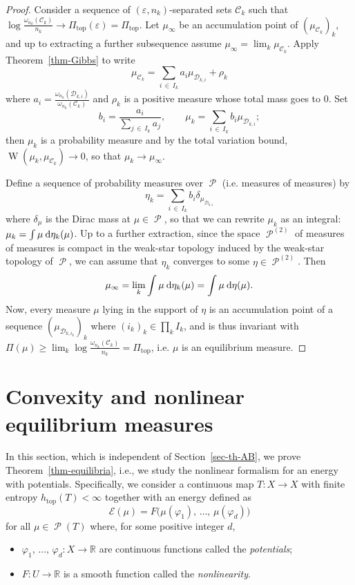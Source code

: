 \documentclass[AHL, Unicode, longabstracts,published]{cedram}
\theoremstyle{plain}
\theoremstyle{plain}
\newcommand\NLP{\Pi}
\renewcommand\top{{\mathrm{top}}}
\newcommand{\wass}{\operatorname{W}}
\newcommand\Prob{{\operatorname{\mathscr{P}}}}
\newcommand*{\dd} {\relax\ifnum\lastnodetype>0\mskip\medmuskip\fi\mathrm{d}}
\newcommand{\pot}{\varphi}
\newcounter{In}
\newcommand*\8{\infty}
\newcommand\RR{\mathbb{R}}
\newcommand{\En}{\mathcal{E}}
\newcommand{\cD}{\mathcal{D}}
\newcommand{\cC}{\mathcal C}
\begin{document}
\begin{proof}
Consider a sequence of $(\varepsilon,n_k)$-separated sets $\cC_k$ such that $\log\frac{\omega_{n_k}(\cC_k)}{n_k} \to \NLP_\top(\varepsilon) = \NLP_\top$. Let $\mu_\infty$ be an accumulation point of $(\mu_{\cC_k})_k$, and up to extracting a further subsequence assume $\mu_\infty = \lim_k \mu_{\cC_k}$. Apply Theorem~\ref{thm-Gibbs} to write
\[
\mu_{\cC_k} = \sum_{i\,\in\,I_k} a_i \mu_{\cD_{k,i}} + \rho_k
\]
where $a_i = \frac{\omega_{n_k}(\cD_{k,i})}{\omega_{n_k}(\cC_k)}$ and $\rho_k$ is a positive measure whose total mass goes to $0$. Set
\[
b_i=\frac{a_i}{\sum_{j\,\in\,I_k} a_j}, \qquad \mu_k= \sum_{i\,\in\,I_k} b_i \mu_{\cD_{k,i}};
\]
then $\mu_k$ is a probability measure and by the total variation bound, $\wass(\mu_k,\mu_{\cC_k})\to0$, so that $\mu_k\to\mu_\infty$.

Define a sequence of probability measures over $\Prob$ (i.e. measures of measures) by
\[
\eta_k=\sum_{i\,\in\,I_k} b_i \delta_{\mu_{\cD_{k,i}}}
\]
where $\delta_\mu$ is the Dirac mass at $\mu\in\Prob$, so that we can rewrite $\mu_k$ as an integral: $\mu_k=\int \mu\dd\eta_k(\mu)$. Up to a further extraction, since the space $\Prob^{(2)}$ of measures of measures is compact in the weak-star topology induced by the weak-star topology of $\Prob$, we can assume that $\eta_k$ converges to some $\eta\in \Prob^{(2)}$. Then
\[
\mu_\infty = \lim_k \int \mu \dd\eta_k(\mu) = \int \mu \dd\eta(\mu).
\]
Now, every measure $\mu$ lying in the support of $\eta$ is an accumulation point of a sequence $(\mu_{\cD_{k,i_k}})_k$ where $(i_k)_k\in\prod_k I_k$, and is thus invariant with $\NLP(\mu) \ge \lim_k \log\frac{\omega_{n_k}(\cC_k)}{n_k} = \NLP_\top$, i.e. $\mu$ is an equilibrium measure.
\end{proof}



\section{Convexity and nonlinear equilibrium measures}\label{sec:convexity}

In this section, which is independent of Section~\ref{sec-th-AB}, we prove Theorem~\ref{thm-equilibria}, i.e., we study the nonlinear formalism for an energy with potentials. Specifically, we consider a continuous map $T:X\to X$ with finite entropy $h_\top(T)<\infty$ together with an energy defined as
\[
\En(\mu) = F\big(\mu(\pot_1),\,\dots,\,\mu(\pot_d)\big)
\]
for all $\mu\in\Prob(T)$ where, for some positive integer $d$,
\begin{itemize}
\item $\pot_1,\,\dots,\,\pot_d:X\to\RR$ are continuous functions called the \emph{potentials};
\item $F:U\to\RR$ is a smooth function called the \emph{nonlinearity}.
\end{itemize}
\end{document}
